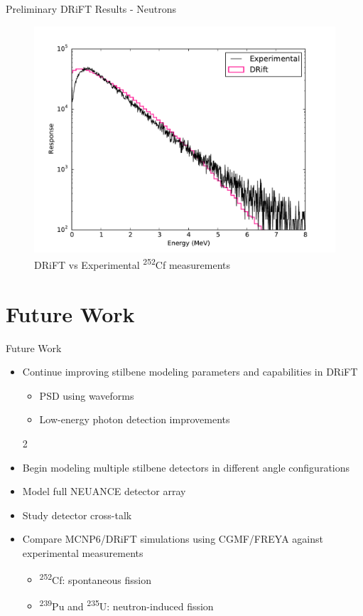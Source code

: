 \documentclass{beamer}
\begin{document}
\begin{frame}{Preliminary DRiFT Results - Neutrons}
\vspace*{-0.3cm}
\begin{figure}
\begin{center}
\includegraphics[scale = 0.45]{drift_neutrons}
\vspace*{-0.5cm}
\caption{\scriptsize{DRiFT vs Experimental \textsuperscript{252}Cf measurements}}
\end{center}
\end{figure}
\end{frame}

\section{Future Work}
\begin{frame}
\sectionpage
\end{frame}

\begin{frame}{Future Work}
\begin{itemize}
\item Continue improving stilbene modeling parameters and capabilities in DRiFT
\begin{itemize}
\item PSD using waveforms
\item Low-energy photon detection improvements 
\end{itemize}2
\item Begin modeling multiple stilbene detectors in different angle configurations
\item Model full NEUANCE detector array
\item Study detector cross-talk
\item Compare MCNP6/DRiFT simulations using CGMF/FREYA against experimental measurements
\begin{itemize}
\item \textsuperscript{252}Cf: spontaneous fission
\item \textsuperscript{239}Pu and \textsuperscript{235}U: neutron-induced fission
\end{itemize}
\end{itemize}
\end{frame}
\end{document}
